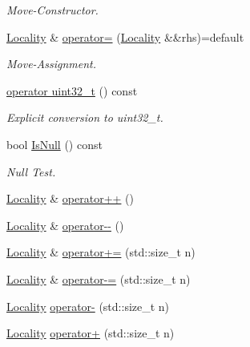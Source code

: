 \begin{DoxyCompactItemize}
\begin{DoxyCompactList}\small\item\em Move-\/\-Constructor. \end{DoxyCompactList}\item 
\hyperlink{classshad_1_1rt_1_1Locality}{Locality} \& \hyperlink{classshad_1_1rt_1_1Locality_a8662089df9212947bcc895ca42aa559c}{operator=} (\hyperlink{classshad_1_1rt_1_1Locality}{Locality} \&\&rhs)=default
\begin{DoxyCompactList}\small\item\em Move-\/\-Assignment. \end{DoxyCompactList}\item 
\hyperlink{classshad_1_1rt_1_1Locality_a59c6ecb89129520f9a8d9619f25f6b2c}{operator uint32\-\_\-t} () const 
\begin{DoxyCompactList}\small\item\em Explicit conversion to uint32\-\_\-t. \end{DoxyCompactList}\item 
bool \hyperlink{classshad_1_1rt_1_1Locality_ad85f3d8427e07bf8a07bd9b0ca482096}{Is\-Null} () const 
\begin{DoxyCompactList}\small\item\em Null Test. \end{DoxyCompactList}\item 
\hyperlink{classshad_1_1rt_1_1Locality}{Locality} \& \hyperlink{classshad_1_1rt_1_1Locality_aad64f6e45b3083a552aec0dd2c582c1e}{operator++} ()
\item 
\hyperlink{classshad_1_1rt_1_1Locality}{Locality} \& \hyperlink{classshad_1_1rt_1_1Locality_ae17cf482dce4cc87c716ba62e92ed478}{operator-\/-\/} ()
\item 
\hyperlink{classshad_1_1rt_1_1Locality}{Locality} \& \hyperlink{classshad_1_1rt_1_1Locality_a22f1d152384124ac1f78c8fc5e359f3f}{operator+=} (std\-::size\-\_\-t n)
\item 
\hyperlink{classshad_1_1rt_1_1Locality}{Locality} \& \hyperlink{classshad_1_1rt_1_1Locality_aa550d9488262a580dc553350eccf75ba}{operator-\/=} (std\-::size\-\_\-t n)
\item 
\hyperlink{classshad_1_1rt_1_1Locality}{Locality} \hyperlink{classshad_1_1rt_1_1Locality_a6a96e2e9922bcc6d79accec3d75e2c82}{operator-\/} (std\-::size\-\_\-t n)
\item 
\hyperlink{classshad_1_1rt_1_1Locality}{Locality} \hyperlink{classshad_1_1rt_1_1Locality_ae5bd60f46c421db3da70d0b1ec084319}{operator+} (std\-::size\-\_\-t n)
\item 

\end{DoxyCompactItemize}
